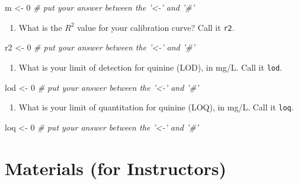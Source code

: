 \documentclass[]{tufte-book}
\newenvironment{Shaded}{}{}
\newcommand{\CommentTok}[1]{\textcolor[rgb]{0.38,0.63,0.69}{\textit{#1}}}
\newcommand{\DecValTok}[1]{\textcolor[rgb]{0.25,0.63,0.44}{#1}}
\newcommand{\NormalTok}[1]{#1}
\newcommand{\StringTok}[1]{\textcolor[rgb]{0.25,0.44,0.63}{#1}}
\providecommand{\tightlist}{%
  \setlength{\itemsep}{0pt}\setlength{\parskip}{0pt}}
\begin{document}
\begin{Shaded}
\begin{Highlighting}[]
\NormalTok{m <-}\StringTok{ }\DecValTok{0}     \CommentTok{# put your answer between the '<-' and '#'}
\end{Highlighting}
\end{Shaded}

\begin{enumerate}
\def\labelenumi{\arabic{enumi}.}
\setcounter{enumi}{7}
\tightlist
\item
  What is the \(R^2\) value for your calibration curve? Call it \texttt{r2}.
\end{enumerate}

\begin{Shaded}
\begin{Highlighting}[]
\NormalTok{r2 <-}\StringTok{ }\DecValTok{0}     \CommentTok{# put your answer between the '<-' and '#'}
\end{Highlighting}
\end{Shaded}

\begin{enumerate}
\def\labelenumi{\arabic{enumi}.}
\setcounter{enumi}{8}
\tightlist
\item
  What is your limit of detection for quinine (LOD), in mg/L. Call it \texttt{lod}.
\end{enumerate}

\begin{Shaded}
\begin{Highlighting}[]
\NormalTok{lod <-}\StringTok{ }\DecValTok{0}     \CommentTok{# put your answer between the '<-' and '#'}
\end{Highlighting}
\end{Shaded}

\begin{enumerate}
\def\labelenumi{\arabic{enumi}.}
\setcounter{enumi}{9}
\tightlist
\item
  What is your limit of quantitation for quinine (LOQ), in mg/L. Call it \texttt{loq}.
\end{enumerate}

\begin{Shaded}
\begin{Highlighting}[]
\NormalTok{loq <-}\StringTok{ }\DecValTok{0}     \CommentTok{# put your answer between the '<-' and '#'}
\end{Highlighting}
\end{Shaded}

\hypertarget{uvvis-materials}{%
\section*{Materials (for Instructors)}\label{uvvis-materials}}
\end{document}
